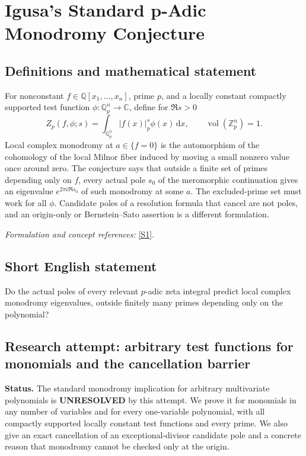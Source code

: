 \documentclass[11pt]{article}
\begin{document}
\section*{\texorpdfstring{Igusa’s Standard p-Adic Monodromy Conjecture}{Igusa’s Standard p-Adic Monodromy Conjecture}}\label{367}
\subsection{Definitions and mathematical statement}
For nonconstant $f\in{\mathbb{Q}}[x_1,\ldots,x_n]$, prime $p$, and a locally constant compactly supported test function $\phi:{\mathbb{Q}}_p^n\to{\mathbb{C}}$, define for $\Re s>0$
\[
 Z_p(f,\phi;s)=\int_{{\mathbb{Q}}_p^n}|f(x)|_p^s\phi(x){\,\mathrm{d}} x,
 \qquad\operatorname{vol}({\mathbb{Z}}_p^n)=1.
\]
Local complex monodromy at $a\in\{f=0\}$ is the automorphism of the cohomology of the local Milnor fiber induced by moving a small nonzero value once around zero. The conjecture says that outside a finite set of primes depending only on $f$, every actual pole $s_0$ of the meromorphic continuation gives an eigenvalue $e^{2\pi i\Re s_0}$ of such monodromy at some $a$. The excluded-prime set must work for all $\phi$. Candidate poles of a resolution formula that cancel are not poles, and an origin-only or Bernstein--Sato assertion is a different formulation.
\par\smallskip\textit{Formulation and concept references:} \href{https://arxiv.org/pdf/2403.03343}{[S1]}.

\subsection{Short English statement}
Do the actual poles of every relevant $p$-adic zeta integral predict local complex monodromy eigenvalues, outside finitely many primes depending only on the polynomial?
\subsection{Research attempt: arbitrary test functions for monomials and the cancellation barrier}
\textbf{Status.} The standard monodromy implication for arbitrary multivariate polynomials is \textbf{UNRESOLVED} by this attempt. We prove it for monomials in any number of variables and for every one-variable polynomial, with all compactly supported locally constant test functions and every prime. We also give an exact cancellation of an exceptional-divisor candidate pole and a concrete reason that monodromy cannot be checked only at the origin.
\end{document}
